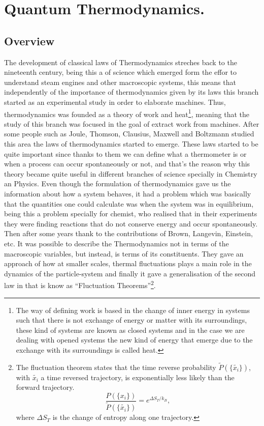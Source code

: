 \chapter{Quantum Thermodynamics.}
\section{Overview}
The development of classical laws of Thermodynamics streches back to the nineteenth century, being this a of science which emerged form the effor to understand steam engines and other macroscopic systems, this means that independently  of the importance of thermodynamics given by its laws this branch started as an experimental study in order to elaborate machines. Thus, thermodynamics was founded as a theory of work and heat\footnote{The way of defining work is based in the change of inner energy in systems such that there is not exchange of energy or matter with its surroundings, these kind of systems are known as closed systems and in the case we are dealing with opened systems the new kind of energy that emerge due to the exchange with its surroundings is called heat.}, meaning that the study of this branch was focused in the goal of extract work from machines. After some people such as Joule, Thomson, Clausius, Maxwell and Boltzmann studied this area the laws of thermodynamics started to emerge. These laws started to be quite important since thanks to them we can define what a thermometer is or when a process can occur spontaneously or not, and that's the reason why this theory became quite useful in different branches of science specially in Chemistry an Physics. Even though the formulation of thermodynamics gave us the information about how a system behaves, it had a problem which was basically that the quantities one could calculate was when the system was in equilibrium, being this a problem specially for chemist, who realised that in their experiments they were finding reactions that do not conserve energy and occur spontaneously\cite{chang}. Then after some years thank to the contributions of Brown, Langevin, Einstein, etc. It was possible to describe the Thermodynamics not in terms of the macroscopic variables, but instead, is terms of its constituents. They gave an approach of how at smaller scales, thermal fluctuations plays a main role in the dynamics of the particle-system and finally it gave a generalisation of the second law in that is know as ``Fluctuation Theorems''\footnote{The fluctuation theorem states that the time reverse probability $\widetilde{P}(\{\widetilde{x_{i}}\})$, with $\widetilde{x_{i}}$ a time reversed trajectory, is exponentially less likely than the forward trajectory.
\[ \frac{P(\{x_i\})}{\widetilde{P}(\{\widetilde{x_i}\})}=e^{\Delta S_{T}/k_B},\]
where $\Delta S_T$ is the change of entropy along one trajectory. 
}.
